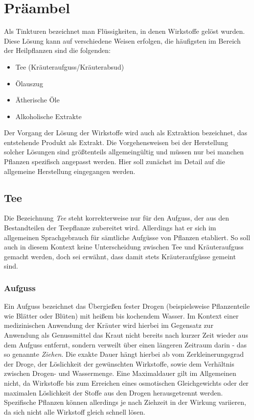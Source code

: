 \chapter{Präambel}

Als Tinkturen bezeichnet man Flüssigkeiten, in denen Wirkstoffe gelöst wurden. Diese Lösung kann auf verschiedene Weisen erfolgen, die häufigsten im Bereich der Heilpflanzen sind die folgenden:
\begin{itemize}
	\item Tee (Kräuteraufguss/Kräuterabsud)
	\item Ölauszug
	\item Ätherische Öle
	\item Alkoholische Extrakte
\end{itemize}

Der Vorgang der Lösung der Wirkstoffe wird auch als Extraktion bezeichnet, das entstehende Produkt als Extrakt. Die Vorgehensweisen bei der Herstellung solcher Lösungen sind größtenteils allgemeingültig und müssen nur bei manchen Pflanzen spezifisch angepasst werden. Hier soll zunächst im Detail auf die allgemeine Herstellung eingegangen werden.

\section{Tee}
Die Bezeichnung \textit{Tee} steht korrekterweise nur für den Aufguss, der aus den Bestandteilen der Teepflanze zubereitet wird. Allerdings hat er sich im allgemeinen Sprachgebrauch für sämtliche Aufgüsse von Pflanzen etabliert. So soll auch in diesem Kontext keine Unterscheidung zwischen Tee und Kräuteraufguss gemacht werden, doch sei erwähnt, dass damit stets Kräuteraufgüsse gemeint sind.

\subsection{Aufguss}
Ein Aufguss bezeichnet das Übergießen fester Drogen (beispielsweise Pflanzenteile wie Blätter oder Blüten) mit heißem bis kochendem Wasser. Im Kontext einer medizinischen Anwendung der Kräuter wird hierbei im Gegensatz zur Anwendung als Genussmittel das Kraut nicht bereits nach kurzer Zeit wieder aus dem Aufguss entfernt, sondern verweilt über einen längeren Zeitraum darin - das so genannte \textit{Ziehen}. Die exakte Dauer hängt hierbei ab vom Zerkleinerungsgrad der Droge, der Löslichkeit der gewünschten Wirkstoffe, sowie dem Verhältnis zwischen Drogen- und Wassermenge. Eine Maximaldauer gilt im Allgemeinen nicht, da Wirkstoffe bis zum Erreichen eines osmotischen Gleichgewichts oder der maximalen Löslichkeit der Stoffe aus den Drogen herausgetrennt werden. Spezifische Pflanzen können allerdings je nach Ziehzeit in der Wirkung variieren, da sich nicht alle Wirkstoff gleich schnell lösen.
